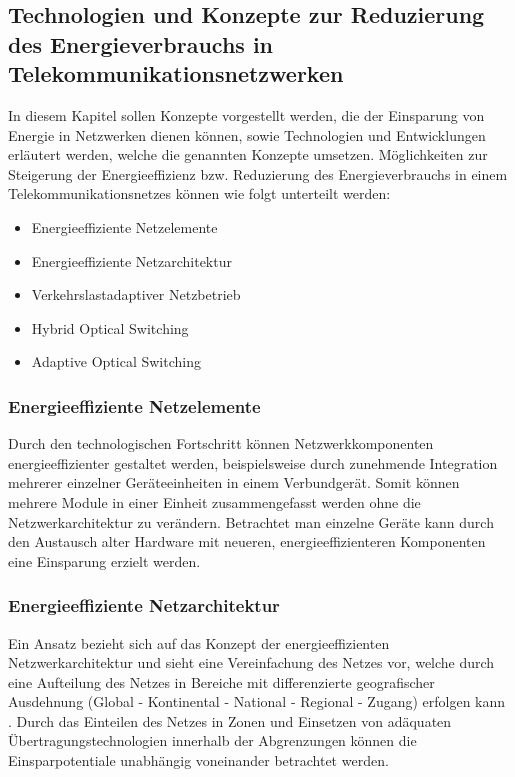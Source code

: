 \subsection{Technologien und Konzepte zur Reduzierung des Energieverbrauchs in Telekommunikationsnetzwerken}
In diesem Kapitel sollen Konzepte vorgestellt werden, die der Einsparung von Energie in Netzwerken dienen können, sowie Technologien und Entwicklungen erläutert werden, welche die genannten Konzepte umsetzen. Möglichkeiten zur Steigerung der Energieeffizienz bzw. Reduzierung des Energieverbrauchs in einem Telekommunikationsnetzes können wie folgt unterteilt werden:
\begin{itemize}
	\item Energieeffiziente Netzelemente
	\item Energieeffiziente Netzarchitektur
	\item Verkehrslastadaptiver Netzbetrieb
	\item Hybrid Optical Switching
	\item Adaptive Optical Switching
\end{itemize}

\subsubsection{Energieeffiziente Netzelemente}
Durch den technologischen Fortschritt können Netzwerkkomponenten energieeffizienter gestaltet werden, beispielsweise durch zunehmende Integration mehrerer einzelner Geräte\-einheiten in einem Verbundgerät. Somit können mehrere Module in einer Einheit zusammengefasst werden ohne die Netzwerkarchitektur zu verändern. Betrachtet man einzelne Geräte kann durch den Austausch alter Hardware mit neueren, energieeffizienteren Komponenten eine Einsparung erzielt werden. 

\subsubsection{Energieeffiziente Netzarchitektur}
Ein Ansatz bezieht sich auf das Konzept der energieeffizienten Netzwerkarchitektur und sieht eine Vereinfachung des Netzes vor, welche durch eine  Aufteilung des Netzes in Bereiche mit differenzierte geografischer Ausdehnung (Global - Kontinental - National - Regional - Zugang) erfolgen kann \cite{aleksic2014}. Durch das Einteilen des Netzes in Zonen und Einsetzen von adäquaten Übertragungs\-technologien innerhalb der Abgrenzungen können die Einsparpotentiale unabhängig voneinander betrachtet werden.

